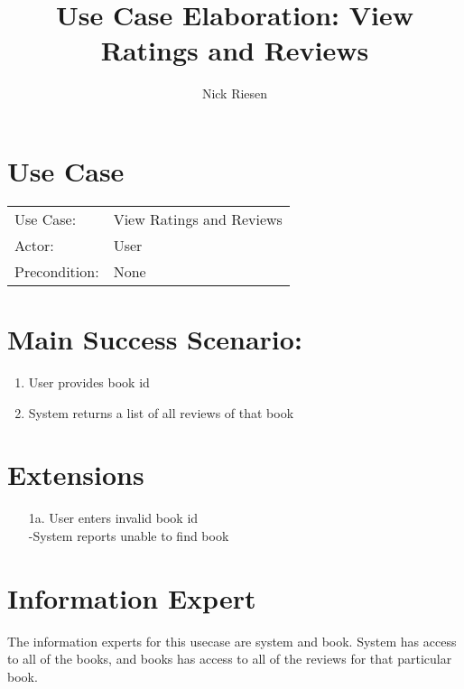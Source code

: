 \documentclass{article}
\title{Use Case Elaboration: View Ratings and Reviews}
\author{ Nick Riesen }
\begin{document}
\maketitle


\section*{Use Case}
\begin{tabular}{l l}
Use Case:     & View Ratings and Reviews      \\
Actor:        & User                          \\
Precondition: & None                          \\
\end{tabular}


\section*{Main Success Scenario:}

\begin{enumerate}
    \item  User provides book id
    \item System returns a list of all reviews of that book

\end{enumerate}

\section*{Extensions}

\begin{itemize}
    \item [1a.] User enters invalid book id \\
        -System reports unable to find book

\end{itemize}

\section*{Information Expert}

The information experts for this usecase are system and book. System has access to all of the books, and books has access to all of the reviews for that particular book.
\end{document}
